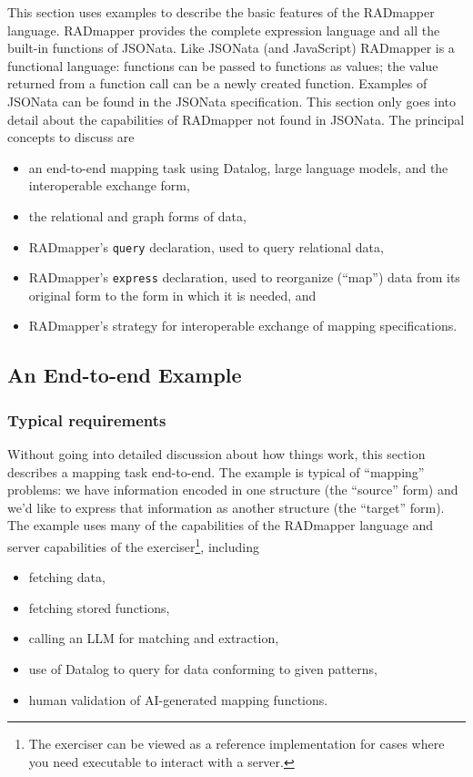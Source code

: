 \documentclass[10pt,letterpaper]{article} %
\newcommand{\stt}[1]{\texttt{#1}} %
\begin{document}
This section uses examples to describe the basic features of the RADmapper language.
RADmapper provides the complete expression language and all the built-in functions of JSONata.
Like JSONata (and JavaScript) RADmapper is a functional language: functions can be passed to functions as values; the value returned from a function call can be a newly created function.
Examples of JSONata can be found in the JSONata specification. %
This section only goes into detail about the capabilities of RADmapper not found in JSONata.
The principal concepts to discuss are

\begin{itemize}
  \item{an end-to-end mapping task using Datalog, large language models, and the interoperable exchange form,}
  \item{the relational and graph forms of data,}
  \item{RADmapper's \stt{query} declaration, used to query relational data,}
  \item{RADmapper's \stt{express} declaration, used to reorganize (``map'') data from its original form to the form in which it is needed, and}
  \item{RADmapper's strategy for interoperable exchange of mapping specifications.}
\end{itemize}

\subsection{An End-to-end Example}

\subsubsection{Typical requirements}

Without going into detailed discussion about how things work, this section describes a mapping task end-to-end.
The example is typical of ``mapping'' problems: we have information encoded in one structure (the ``source'' form) and we'd like to express that information as another structure (the ``target'' form).
The example uses many of the capabilities of the RADmapper language and server capabilities of the exerciser\footnote{The exerciser can be viewed as a reference implementation for cases where you need executable to interact with a server.}, including
\begin{itemize}
  \item{fetching data,}
  \item{fetching stored functions,}
  \item{calling an LLM for matching and extraction,}
  \item{use of Datalog to query for data conforming to given patterns,}
  \item{human validation of AI-generated mapping functions.}
  \end{itemize}
\end{document}
